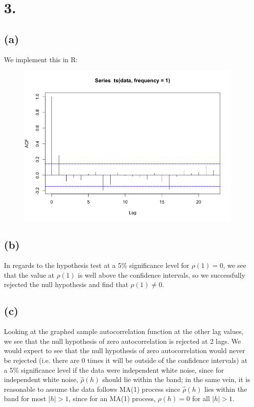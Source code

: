 \documentclass{article}
\begin{document}
\section*{3.}
{\Large 

\subsection*{(a)}

We implement this in R: \\ 
\begin{figure}[h!]
  \centering
  \includegraphics[width=500pt]{hw8_3a.png}
\end{figure}

\subsection*{(b)}

In regards to the hypothesis test at a 5\% significance level for $\rho(1) = 0$, we see that the value at $\rho(1)$ is well above the confidence intervals, so we successfully rejected the null hypothesis and find that $\rho(1) \neq 0$.

\subsection*{(c)}

Looking at the graphed sample autocorrelation function at the other lag values, we see that the null hypothesis of zero autocorrelation is rejected at 2 lags. We would expect to see that the null hypothesis of zero autocorrelation would never be rejected (i.e. there are 0 times it will be outside of the confidence intervals) at a 5\% significance level if the data were independent white noise, since for independent white noise, $\hat{\rho}(h)$ should lie within the band; in the same vein, it is reasonable to assume the data follows MA(1) process since $\hat{\rho}(h)$ lies within the band for most $|h| > 1$, since for an MA(1) process, $\rho(h) = 0$ for all $|h| > 1$.

}
\end{document}
